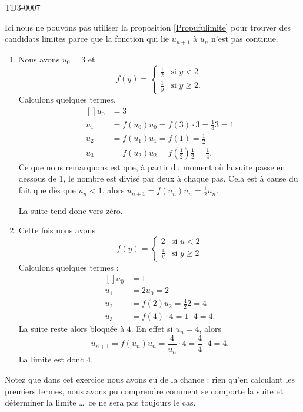 
\begin{corrige}{TD3-0007}

	Ici nous ne pouvons pas utiliser la proposition \ref{Propufulimite} pour trouver des candidats limites parce que la fonction qui lie $u_{n+1}$ à $u_n$ n'est pas continue.
	\begin{enumerate}
		\item
			Nous avons $u_0=3$ et
			\begin{equation}
				f(y)=\begin{cases}
					\frac{ 1 }{2}	&	\text{si }y<2\\
					\frac{1}{ y }	&	 \text{si }y\geq 2.
				\end{cases}
			\end{equation}
			Calculons quelques termes.
			\begin{equation}
				\begin{aligned}[]
					u_0&=3\\
					u_1&=f(u_0)u_0=f(3)\cdot 3=\frac{1}{ 3 }3=1\\
					u_2&=f(u_1)u_1=f(1)=\frac{ 1 }{2}\\
					u_3&=f(u_2)u_2=f(\frac{ 1 }{2})\frac{ 1 }{2}=\frac{1}{ 4 }.
				\end{aligned}
			\end{equation}
			Ce que nous remarquons est que, à partir du moment où la suite passe en dessous de $1$, le nombre est divisé par deux à chaque pas. Cela est à cause du fait que dès que $u_n<1$, alors $u_{n+1}=f(u_n)u_n=\frac{ 1 }{2}u_n$.

			La suite tend donc vers zéro.
		\item
			Cette fois nous avons
			\begin{equation}
				f(y)=\begin{cases}
					2	&	\text{si }u<2\\
					\frac{ 4 }{ y }	&	 \text{si }y\geq 2
				\end{cases}
			\end{equation}
			Calculons quelques termes :
			\begin{equation}
				\begin{aligned}[]
					u_0&=1\\
					u_1&=2u_0=2\\
					u_2&=f(2)u_2=\frac{ 4 }{ 2 }2=4\\
					u_3&=f(4)\cdot 4=1\cdot 4=4.
				\end{aligned}
			\end{equation}
			La suite reste alors bloquée à $4$. En effet si $u_n=4$, alors
			\begin{equation}
				u_{n+1}=f(u_n)u_n=\frac{ 4 }{ u_n }\cdot 4=\frac{ 4 }{ 4 }\cdot 4=4.
			\end{equation}
			La limite est donc $4$.
	\end{enumerate}
	
	Notez que dans cet exercice nous avons eu de la chance : rien qu'en calculant les premiers termes, nous avons pu comprendre comment se comporte la suite et déterminer la limite \ldots\ ce ne sera pas toujours le cas.

\end{corrige}
